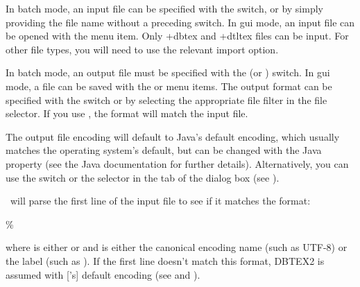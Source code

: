 In batch mode, an input file can be specified with the 
switch, or by simply providing the file name without a preceding switch.
In \gls{gui} mode, an input file can be opened with the
 menu item. Only \ext+{dbtex} and \ext+{dtltex} files can be
input. For other file types, you will need to use the relevant
import option.

In batch mode, an output file must be specified with the
 (or ) switch. In \gls{gui} mode, a file
can be saved with the  or  menu
items. The output format can be specified with the
 switch or by selecting the appropriate file
filter in the  file selector. If you use
, the format will match the input file.

The output file encoding will default to Java's default
encoding, which usually matches the operating system's default, but
can be changed with the Java  property (see the
Java documentation for further details). Alternatively, you can use
the  switch or the selector in the
 tab of the 
dialog box (see ).

\appname\ will parse the first line of the input file to see if it
matches the format:
\begin{compactcodebox}
\%  
\end{compactcodebox}
where  is either  or  and
 is either the canonical encoding name (such as
UTF-8) or the  label (such as ).
If the first line doesn't match this format, \gls{DBTEX2} is
assumed with ['s] default encoding (see
 and ).

